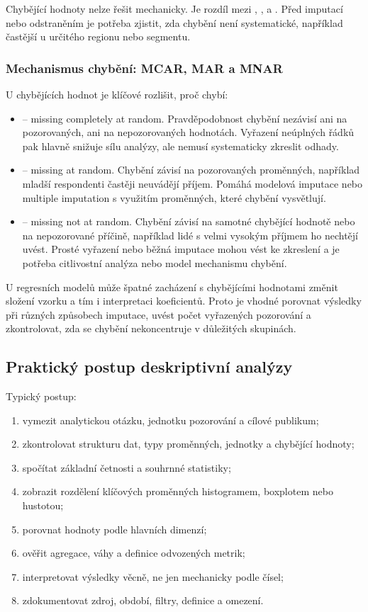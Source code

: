 Chybějící hodnoty nelze řešit mechanicky. Je rozdíl mezi , ,
 a . Před imputací nebo odstraněním je potřeba zjistit,
zda chybění není systematické, například častější u určitého regionu nebo segmentu.

\subsubsection{Mechanismus chybění: MCAR, MAR a MNAR}
U chybějících hodnot je klíčové rozlišit, proč chybí:
\begin{itemize}
  \item {} -- missing completely at random. Pravděpodobnost chybění nezávisí ani na pozorovaných,
  ani na nepozorovaných hodnotách. Vyřazení neúplných řádků pak hlavně snižuje sílu analýzy, ale nemusí
  systematicky zkreslit odhady.
  \item {} -- missing at random. Chybění závisí na pozorovaných proměnných, například mladší
  respondenti častěji neuvádějí příjem. Pomáhá modelová imputace nebo multiple imputation s využitím
  proměnných, které chybění vysvětlují.
  \item {} -- missing not at random. Chybění závisí na samotné chybějící hodnotě nebo na
  nepozorované příčině, například lidé s velmi vysokým příjmem ho nechtějí uvést. Prosté vyřazení
  nebo běžná imputace mohou vést ke zkreslení a je potřeba citlivostní analýza nebo model mechanismu
  chybění.
\end{itemize}

U regresních modelů může špatné zacházení s chybějícími hodnotami změnit složení vzorku a tím i
interpretaci koeficientů. Proto je vhodné porovnat výsledky při různých způsobech imputace, uvést
počet vyřazených pozorování a zkontrolovat, zda se chybění nekoncentruje v důležitých skupinách.

\subsection{Praktický postup deskriptivní analýzy}
Typický postup:
\begin{enumerate}
  \item vymezit analytickou otázku, jednotku pozorování a cílové publikum;
  \item zkontrolovat strukturu dat, typy proměnných, jednotky a chybějící hodnoty;
  \item spočítat základní četnosti a souhrnné statistiky;
  \item zobrazit rozdělení klíčových proměnných histogramem, boxplotem nebo hustotou;
  \item porovnat hodnoty podle hlavních dimenzí;
  \item ověřit agregace, váhy a definice odvozených metrik;
  \item interpretovat výsledky věcně, ne jen mechanicky podle čísel;
  \item zdokumentovat zdroj, období, filtry, definice a omezení.
\end{enumerate}

